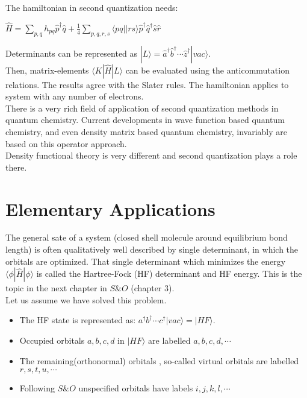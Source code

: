 \documentclass[a4paper, 12pt]{article}
\begin{document}
\begin{summary}{}{}
The hamiltonian in second quantization needs: 
\begin{center}
	$\hat{H}=\sum_{p,q} h_{pq}\hat{p}^\dagger\hat{q}+\frac{1}{4} \sum_{p,q,r,s} \langle pq||rs\rangle \hat{p}^\dagger \hat{q}^\dagger \hat{s} \hat{r}$
\end{center} 
\tab Determinants can be represented as $|L\rangle=\hat{a}^\dagger\hat{b}^\dagger\cdots\hat{z}^\dagger|vac\rangle $.\\
\tab Then, matrix-elements $\langle K|\hat{H}|L\rangle$ can be evaluated using the anticommutation relations. The results agree with the Slater rules. The hamiltonian applies to system with any number of electrons. \\
\tab There is a very rich field of application of second quantization methods in quantum chemistry. Current developments in wave function based quantum chemistry, and even density matrix based quantum chemistry, invariably are based on this operator approach.\\
\tab Density functional theory is very different and second quantization plays a role there.
\end{summary}

\section{Elementary Applications}
The general sate of a system (closed shell molecule around equilibrium bond length) is often qualitatively well described by single determinant, in which the orbitals are optimized. That single determinant which minimizes the energy $\langle \phi|\hat{H}|\phi\rangle$ is called the Hartree-Fock (HF) determinant and HF energy. This is the topic in the next chapter in $S\&O$ (chapter 3).\\
\tab Let us assume we have solved this problem. 


\begin{itemize}
	\item The HF   state is represented as:  $a^\dagger b^\dagger \cdots c^\dagger |vac\rangle = |HF\rangle$. 
	\item Occupied orbitals $a,b,c,d$ in $|HF\rangle$ are labelled $a,b,c,d,\cdots$ 
	\item The remaining(orthonormal) orbitals , so-called virtual orbitals are labelled $r,s,t,u,\cdots$
	\item  Following $S\& O $ unspecified orbitals have labels $i,j,k,l,\cdots$
\end{itemize}
\end{document}
